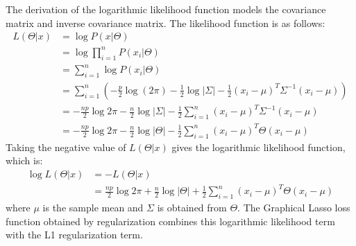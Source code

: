 The derivation of the logarithmic likelihood function models the covariance matrix and inverse covariance matrix. The likelihood function is as follows: $$
	\begin{aligned}
		L(\Theta|x) & =\log P(x|\Theta)                                                                                                                   \\
		            & =\log \prod_{i=1}^{n} P(x_i|\Theta)                                                                                                 \\
		            & =\sum_{i=1}^{n} \log P(x_i|\Theta)                                                                                                  \\
		            & =\sum_{i=1}^{n} \left( -\frac{p}{2} \log(2 \pi ) - \frac{1}{2} \log |\Sigma| -\frac{1}{2} (x_i-\mu)^T \Sigma^{-1} (x_i-\mu) \right) \\
		            & =-\frac{np}{2} \log2\pi -\frac{n}{2} \log |\Sigma| -\frac{1}{2} \sum_{i=1}^{n} (x_i-\mu)^T \Sigma^{-1} (x_i-\mu)                    \\
		            & =-\frac{np}{2} \log2\pi -\frac{n}{2} \log |\Theta| -\frac{1}{2} \sum_{i=1}^{n} (x_i-\mu)^T \Theta (x_i-\mu)
	\end{aligned}
$$ Taking the negative value of $L(\Theta|x)$ gives the logarithmic likelihood function, which is: $$
	\begin{aligned}
		\log L(\Theta|x) & =-L(\Theta|x)                                                                                              \\
		                 & =\frac{np}{2} \log2\pi +\frac{n}{2} \log |\Theta| +\frac{1}{2} \sum_{i=1}^{n} (x_i-\mu)^T \Theta (x_i-\mu)
	\end{aligned}
$$ where $\mu$ is the sample mean and $\Sigma$ is obtained from $\Theta$. The Graphical Lasso loss function obtained by regularization combines this logarithmic likelihood term with the L1 regularization term.
